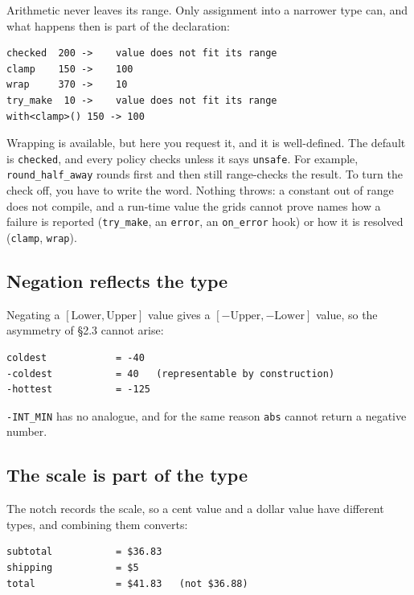 \documentclass[11pt,a4paper]{article}
\newcommand{\code}[1]{\texttt{\small #1}}
\begin{document}
Arithmetic never leaves its range. Only assignment into a narrower type can,
and what happens then is part of the declaration:


\begin{lstlisting}[style=term]
checked  200 ->    value does not fit its range
clamp    150 ->    100
wrap     370 ->    10
try_make  10 ->    value does not fit its range
with<clamp>() 150 -> 100
\end{lstlisting}

\noindent
Wrapping is available, but here you request it, and it is well-defined. The
default is \code{checked}, and every policy checks unless it says
\code{unsafe}. For example, \code{round\_half\_away} rounds first and then still
range-checks the result. To turn the check off, you have to write the word.
Nothing throws: a constant out of range does not compile, and a run-time value
the grids cannot prove names how a failure is reported (\code{try\_make}, an
\code{error}, an \code{on\_error} hook) or how it is resolved (\code{clamp},
\code{wrap}).

\subsection{Negation reflects the type}

Negating a $[\text{Lower},\text{Upper}]$ value gives a
$[-\text{Upper},-\text{Lower}]$ value, so the asymmetry of \S2.3 cannot arise:


\begin{lstlisting}[style=term]
coldest            = -40
-coldest           = 40   (representable by construction)
-hottest           = -125
\end{lstlisting}

\noindent
\code{-INT\_MIN} has no analogue, and for the same reason \code{abs} cannot
return a negative number.

\subsection{The scale is part of the type}

The notch records the scale, so a cent value and a dollar value have different
types, and combining them converts:


\begin{lstlisting}[style=term]
subtotal           = $36.83
shipping           = $5
total              = $41.83   (not $36.88)
\end{lstlisting}
\end{document}
